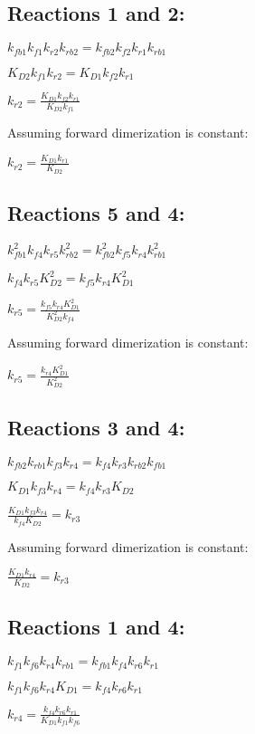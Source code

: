 \documentclass[12pt]{article}
\begin{document}
\subsection*{Reactions 1 and 2:}

$k_{fb1} k_{f1} k_{r2} k_{rb2} = k_{fb2} k_{f2} k_{r1} k_{rb1}$

$K_{D2} k_{f1} k_{r2} = K_{D1} k_{f2} k_{r1}$

$ k_{r2} = \frac{K_{D1} k_{f2} k_{r1}}{K_{D2} k_{f1}}$

Assuming forward dimerization is constant:

$ k_{r2} = \frac{K_{D1} k_{r1}}{K_{D2}}$


\subsection*{Reactions 5 and 4:}

$k_{fb1}^2 k_{f4} k_{r5} k_{rb2}^2 = k_{fb2}^2 k_{f5} k_{r4} k_{rb1}^2$

$k_{f4} k_{r5} K_{D2}^2 = k_{f5} k_{r4} K_{D1}^2$

$k_{r5}  = \frac{k_{f5} k_{r4} K_{D1}^2}{K_{D2}^2 k_{f4}}$

Assuming forward dimerization is constant:

$k_{r5}  = \frac{k_{r4} K_{D1}^2}{K_{D2}^2}$

\subsection*{Reactions 3 and 4:}

$k_{fb2} k_{rb1} k_{f3} k_{r4} = k_{f4} k_{r3} k_{rb2} k_{fb1}$

$K_{D1} k_{f3} k_{r4} = k_{f4} k_{r3} K_{D2}$

$\frac{K_{D1} k_{f3} k_{r4}}{ k_{f4}  K_{D2} } = k_{r3} $

Assuming forward dimerization is constant:

$\frac{K_{D1} k_{r4}}{ K_{D2} } = k_{r3} $

\subsection*{Reactions 1 and 4:}

$k_{f1} k_{f6} k_{r4} k_{rb1} = k_{fb1} k_{f4} k_{r6} k_{r1}$

$k_{f1} k_{f6} k_{r4} K_{D1} = k_{f4} k_{r6} k_{r1}$

$ k_{r4} = \frac{k_{f4} k_{r6} k_{r1}}{K_{D1} k_{f1} k_{f6}}$
\end{document}
